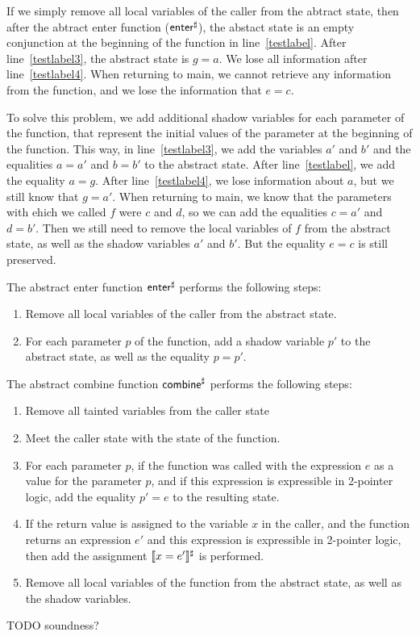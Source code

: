 \begin{example}
If we simply remove all local variables of the caller from the abtract state, then
after the abtract enter function ($\textsf{enter}^\sharp$), the abstact state is an empty conjunction
at the beginning of the function in line~\ref{testlabel}.
After line~\ref{testlabel3}, the abstract state is $g = a$.
We lose all information after line~\ref{testlabel4}.
When returning to \textsf{main}, we cannot retrieve any information from the function,
and we lose the information that $e = c$.

To solve this problem, we add additional shadow variables for each parameter of the function,
that represent the initial values of the parameter at the beginning of the function.
This way, in line~\ref{testlabel3}, we add the variables $a'$ and $b'$ and the equalities $a = a'$ and $b = b'$
to the abstract state.
After line~\ref{testlabel}, we add the equality $a = g$.
After line~\ref{testlabel4}, we lose information about $a$, but we still know that $g = a'$.
When returning to \textsf{main},
we know that the parameters with ehich we called $f$ were $c$ and $d$,
so we can add the equalities $c = a'$ and $d = b'$.
Then we still need to remove the local variables of $f$ from the abstract state,
as well as the shadow variables $a'$ and $b'$.
But the  equality $e = c$ is still preserved.
\end{example}

The abstract enter function $\textsf{enter}^\sharp$ performs the following steps:
\begin{enumerate}
    \item Remove all local variables of the caller from the abstract state.
    \item For each parameter $p$ of the function, add a shadow variable $p'$ to the abstract state,
as well as the equality $p = p'$.
\end{enumerate}

The abstract combine function $\textsf{combine}^\sharp$ performs the following steps:
\begin{enumerate}
    \item Remove all tainted  variables from the caller state
    \item Meet the caller state with the state of the function.
    \item For each parameter $p$, if the function was called with the
    expression $e$ as a value for the parameter $p$, and if this expression is expressible in 2-pointer logic,
     add the equality $p' = e$ to the resulting state.
    \item If the return value is assigned to the variable $x$ in the caller,
    and the function returns an expression $e'$ and this expression is expressible in 2-pointer logic,
    then add the assignment $\llbracket x = e'\rrbracket^\sharp$ is performed.
    \item Remove all local variables of the function from the abstract state,
    as well as the shadow variables.
\end{enumerate}
TODO soundness?
